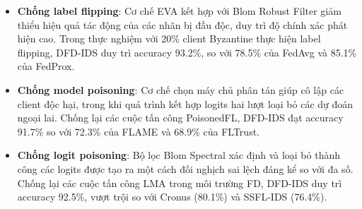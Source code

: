 \begin{itemize}
    \item \textbf{Chống label flipping}: Cơ chế EVA kết hợp với Blom Robust Filter giảm thiểu hiệu quả tác động của các nhãn bị đầu độc, duy trì độ chính xác phát hiện cao. Trong thực nghiệm với 20\% client Byzantine thực hiện label flipping, DFD-IDS duy trì accuracy 93.2\%, so với 78.5\% của FedAvg và 85.1\% của FedProx.
    \item \textbf{Chống model poisoning}: Cơ chế chọn máy chủ phân tán giúp cô lập các client độc hại, trong khi quá trình kết hợp logits hai lượt loại bỏ các dự đoán ngoại lai. Chống lại các cuộc tấn công PoisonedFL, DFD-IDS đạt accuracy 91.7\% so với 72.3\% của FLAME và 68.9\% của FLTrust.
    \item \textbf{Chống logit poisoning}: Bộ lọc Blom Spectral xác định và loại bỏ thành công các logits được tạo ra một cách đối nghịch sai lệch đáng kể so với đa số. Chống lại các cuộc tấn công LMA trong môi trường FD, DFD-IDS duy trì accuracy 92.5\%, vượt trội so với Cronus (80.1\%) và SSFL-IDS (76.4\%).
\end{itemize}

\begin{table}[H]
\centering
\small
\caption{Kết quả tấn công Targeted Flip (epsilon=0.2, RNN-GRU)}
\label{tab:targeted_flip}
\end{table}

